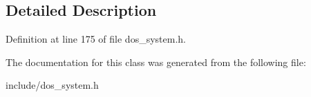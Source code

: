 \subsection{Detailed Description}


Definition at line 175 of file dos\-\_\-system.\-h.



The documentation for this class was generated from the following file\-:\begin{DoxyCompactItemize}
\item 
include/dos\-\_\-system.\-h\end{DoxyCompactItemize}
